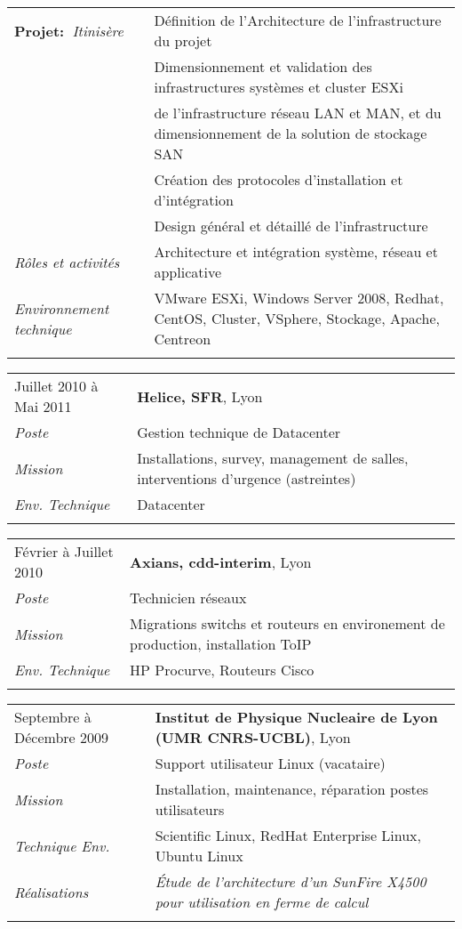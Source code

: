 \documentclass[a4paper]{article}
\begin{document}
\begin{tabular}{P{3.5cm}|p{13cm}}
\textbf{Projet:~}\textit{Itinisère}	& Définition de l’Architecture de l'infrastructure du projet\\
				& Dimensionnement et validation des infrastructures systèmes et cluster ESXi\\
				& de l'infrastructure réseau LAN et MAN, et du dimensionnement de la solution de stockage SAN\\
				& Création des protocoles d'installation et d'intégration\\
				& Design général et détaillé de l'infrastructure\\
\textsl{Rôles et activités}	& Architecture et intégration système, réseau et applicative\\
\textsl{Environnement technique} & VMware ESXi, Windows Server 2008, Redhat, CentOS, Cluster, VSphere, Stockage, Apache, Centreon\\
 & \\
\end{tabular}

\begin{tabular}{P{3.5cm}|p{13cm}}
Juillet 2010 à Mai 2011	& \textbf{Helice, SFR}, Lyon\\
\textsl{Poste}			& Gestion technique de Datacenter\\
\textsl{Mission}		& Installations, survey, management de salles, interventions d'urgence (astreintes)\\
\textsl{Env. Technique}		& Datacenter\\
 & \\
\end{tabular}

\begin{tabular}{P{3.5cm}|p{13cm}}
Février à Juillet 2010	& \textbf{Axians, cdd-interim}, Lyon\\
\textsl{Poste}	 		& Technicien réseaux\\
\textsl{Mission}		& Migrations switchs et routeurs en environement de production, installation ToIP\\
\textsl{Env. Technique}		& HP Procurve, Routeurs Cisco\\
 & \\
\end{tabular}

\begin{tabular}{P{3.5cm}|p{13cm}}
Septembre à Décembre 2009	& \textbf{Institut de Physique Nucleaire de Lyon (UMR CNRS-UCBL)}, Lyon\\
\textsl{Poste}	 		& Support utilisateur Linux (vacataire)\\
\textsl{Mission} 		& Installation, maintenance, réparation postes utilisateurs\\
\textsl{Technique Env.}		& Scientific Linux, RedHat Enterprise Linux, Ubuntu Linux\\
\textsl{Réalisations}		& \textsl{\'{E}tude de l'architecture d'un SunFire X4500 pour utilisation en ferme de calcul}\\
 & \\
\end{tabular}
\end{document}
